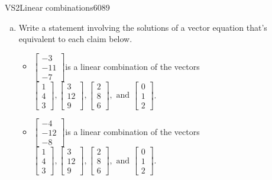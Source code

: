 \begin{exercise}{VS2}{Linear combinations}{6089} 
\begin{exerciseStatement} 

\begin{enumerate}[(a)]
\item  

 Write a statement involving the solutions of a vector equation that's equivalent to each claim below. 

 

\begin{itemize}
\item  

 \(\left[\begin{array}{c}
-3 \\
-11 \\
-7
\end{array}\right]\)is a linear combination of the vectors \(\left[\begin{array}{c}
1 \\
4 \\
3
\end{array}\right] , \left[\begin{array}{c}
3 \\
12 \\
9
\end{array}\right] , \left[\begin{array}{c}
2 \\
8 \\
6
\end{array}\right] , \text{ and } \left[\begin{array}{c}
0 \\
1 \\
2
\end{array}\right]\). 

 
\item  

 \(\left[\begin{array}{c}
-4 \\
-12 \\
-8
\end{array}\right]\)is a linear combination of the vectors \(\left[\begin{array}{c}
1 \\
4 \\
3
\end{array}\right] , \left[\begin{array}{c}
3 \\
12 \\
9
\end{array}\right] , \left[\begin{array}{c}
2 \\
8 \\
6
\end{array}\right] , \text{ and } \left[\begin{array}{c}
0 \\
1 \\
2
\end{array}\right]\). 


\end{itemize}
\end{enumerate}
\end{exerciseStatement}
\end{exercise}
